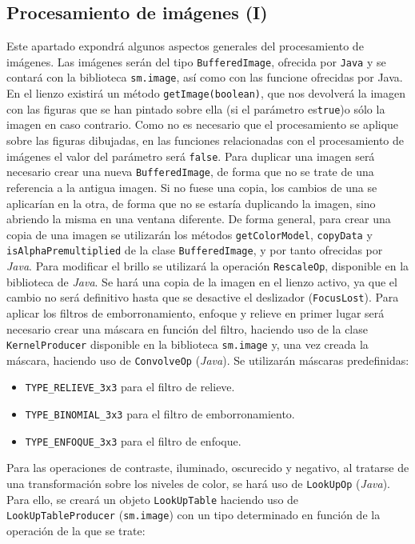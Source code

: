 \subsection{Procesamiento de imágenes (I)}
Este apartado expondrá algunos aspectos generales del procesamiento de imágenes.
\vskip0.3cm
Las imágenes serán del tipo \texttt{BufferedImage}, ofrecida por \texttt{Java} y se contará con la biblioteca \texttt{sm.image}, así como con las funcione ofrecidas por Java. En el lienzo existirá un método \texttt{getImage(boolean)}, que nos devolverá la imagen con las figuras que se han pintado sobre ella (si el parámetro es\texttt{true})o sólo la imagen en caso contrario. Como no es necesario que el procesamiento se aplique sobre las figuras dibujadas, en las funciones relacionadas con el procesamiento de imágenes el valor del parámetro será \texttt{false}.
\vskip0.3cm
Para duplicar una imagen será necesario crear una nueva \texttt{BufferedImage}, de forma que no se trate de una referencia a la antigua imagen. Si no fuese una copia, los cambios de una se aplicarían en la otra, de forma que no se estaría duplicando la imagen, sino abriendo la misma en una ventana diferente.
De forma general, para crear una copia de una imagen se utilizarán los métodos \texttt{getColorModel}, \texttt{copyData} y \texttt{isAlphaPremultiplied} de la clase \texttt{BufferedImage}, y por tanto ofrecidas por \textit{Java}.
\vskip0.3cm
Para modificar el brillo se utilizará la operación \texttt{RescaleOp}, disponible en la biblioteca de \textit{Java}. Se hará una copia de la imagen en el lienzo activo, ya que el cambio no será definitivo hasta que se desactive el deslizador (\texttt{FocusLost}).
\vskip0.3cm
Para aplicar los filtros de emborronamiento, enfoque y relieve en primer lugar será necesario crear una máscara en función del filtro, haciendo uso de la clase \texttt{KernelProducer} disponible en la biblioteca \texttt{sm.image} y, una vez creada la máscara, haciendo uso de \texttt{ConvolveOp} (\textit{Java}). Se utilizarán máscaras predefinidas:
\begin{itemize}
\item{\texttt{TYPE\_RELIEVE\_3x3} para el filtro de relieve.}
\item{\texttt{TYPE\_BINOMIAL\_3x3} para el filtro de emborronamiento.}
\item{\texttt{TYPE\_ENFOQUE\_3x3} para el filtro de enfoque.}
\end{itemize}
\vskip0.3cm
Para las operaciones de contraste, iluminado, oscurecido y negativo, al tratarse de una transformación sobre los niveles de color, se hará uso de \texttt{LookUpOp} (\textit{Java}). Para ello, se creará un objeto \texttt{LookUpTable} haciendo uso de \texttt{LookUpTableProducer} (\texttt{sm.image})  con un tipo determinado en función de la operación de la que se trate:
